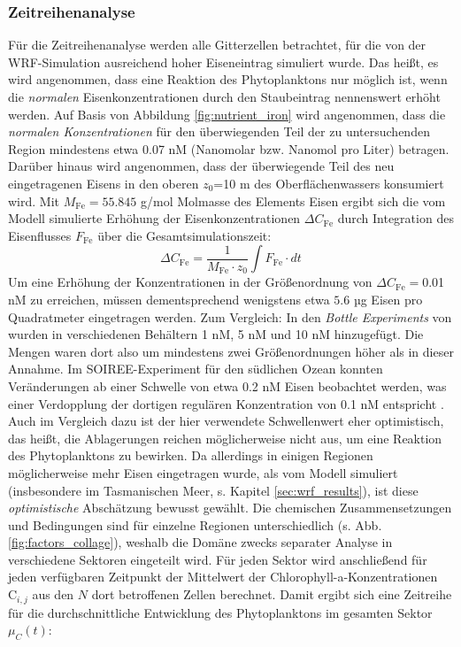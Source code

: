 \documentclass[12pt,a4paper,onecolumn]{scrartcl}
\begin{document}
\subsubsection{Zeitreihenanalyse} \label{sec:timeseries}
Für die Zeitreihenanalyse werden alle Gitterzellen betrachtet, für die von der WRF-Simulation ausreichend hoher Eiseneintrag simuliert wurde. Das heißt, es wird angenommen, dass eine Reaktion des Phytoplanktons nur möglich ist, wenn die \textit{normalen} Eisenkonzentrationen durch den Staubeintrag nennenswert erhöht werden. Auf Basis von Abbildung \ref{fig:nutrient_iron} wird angenommen, dass die \textit{normalen Konzentrationen} für den überwiegenden Teil der zu untersuchenden Region mindestens etwa 0.07 nM (Nanomolar bzw. Nanomol pro Liter) betragen. Darüber hinaus wird angenommen, dass der überwiegende Teil des neu eingetragenen Eisens in den oberen $z_0$=10 m des Oberflächenwassers konsumiert wird. Mit  $M_{\text{Fe}} =  55.845$ g/mol Molmasse des Elements Eisen ergibt sich die vom Modell simulierte Erhöhung der Eisenkonzentrationen $\Delta C_\text{Fe}$ durch Integration des Eisenflusses $F_\text{Fe}$ über die Gesamtsimulationszeit:
\begin{equation}
\Delta C_\text{Fe} = \frac{1}{M_\text{Fe} \cdot z_0} \int F_\text{Fe} \cdot dt
\end{equation}
Um eine Erhöhung der Konzentrationen in der Größenordnung von $\Delta C_\text{Fe}=$0.01 nM zu erreichen, müssen dementsprechend wenigstens etwa $5.6$ µg Eisen pro Quadratmeter eingetragen werden. Zum Vergleich: In den \textit{Bottle Experiments} von \citet{Martin.1988} wurden in verschiedenen Behältern 1 nM, 5 nM und 10 nM hinzugefügt. Die Mengen waren dort also um mindestens zwei Größenordnungen höher als in dieser Annahme. Im SOIREE-Experiment für den südlichen Ozean \citep{Trull.2001} konnten Veränderungen ab einer Schwelle von etwa 0.2 nM Eisen beobachtet werden, was einer Verdopplung der dortigen regulären Konzentration von 0.1 nM entspricht \citep{Boyd.2010}. Auch im Vergleich dazu ist der hier verwendete Schwellenwert eher optimistisch, das heißt, die Ablagerungen reichen möglicherweise nicht aus, um eine Reaktion des Phytoplanktons zu bewirken. Da allerdings in einigen Regionen möglicherweise mehr Eisen eingetragen wurde, als vom Modell simuliert (insbesondere im Tasmanischen Meer, s. Kapitel \ref{sec:wrf_results}), ist diese \textit{optimistische} Abschätzung bewusst gewählt. Die  chemischen Zusammensetzungen und Bedingungen sind für einzelne Regionen unterschiedlich (s. Abb. \ref{fig:factors_collage}), weshalb die Domäne zwecks separater Analyse in verschiedene Sektoren eingeteilt wird. Für jeden Sektor wird anschließend für jeden verfügbaren Zeitpunkt der Mittelwert der Chlorophyll-a-Konzentrationen $\text{C}_{i,j}$ aus den $N$ dort betroffenen Zellen berechnet. Damit ergibt sich eine Zeitreihe für die durchschnittliche Entwicklung des Phytoplanktons im gesamten Sektor $\mu_C(t)$:
\end{document}
